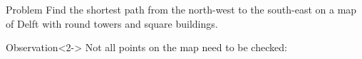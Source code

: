 \begin{frame}
    \frametitle{\problemtitle}
    \begin{block}{Problem}
        Find the shortest path from the north-west to the south-east on a map of Delft with round towers and square buildings.
    \end{block}
    \begin{block}{Observation}<2->
        Not all points on the map need to be checked:
    \end{block}
    \centering
\end{frame}

